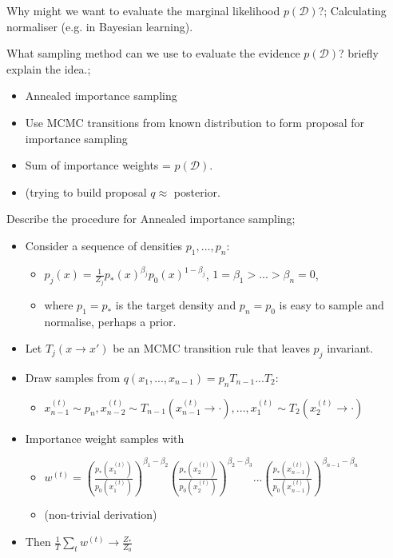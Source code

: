 \documentclass{article}
\begin{document}

Why might we want to evaluate the marginal likelihood $p(\mathcal{D})$?; Calculating normaliser (e.g. in Bayesian learning).

What sampling method can we use to evaluate the evidence $p(\mathcal{D})$? briefly explain the idea.; \begin{itemize} \item Annealed importance sampling \item Use MCMC transitions from known distribution to form proposal for importance sampling \item Sum of importance weights = $p(\mathcal{D})$. \item (trying to build proposal $q\approx$ posterior. \end{itemize}

Describe the procedure for Annealed importance sampling; \begin{itemize} \item Consider a sequence of densities $p_1, ..., p_n$: \begin{itemize} \item $p_j(x) = \frac{1}{Z_j}p_*(x)^{\beta_j}p_0(x)^{1-\beta_j}$, $1=\beta_1 > ... > \beta_n = 0$, \item where $p_1 = p_*$ is the target density and $p_n = p_0$ is easy to sample and normalise, perhaps a prior. \end{itemize} \item Let $T_j(x\rightarrow x')$ be an MCMC transition rule that leaves $p_j$ invariant. \item Draw samples from $q(x_1,...,x_{n-1}) = p_nT_{n-1}...T_2$: \begin{itemize} \item $x_{n-1}^{(t)}\sim p_n, x^{(t)}_{n-2} \sim T_{n-1}(x^{(t)}_{n-1}\rightarrow \cdot ), ..., x^{(t)}_1\sim T_2(x_2^{(t)}\rightarrow \cdot)$ \end{itemize} \item Importance weight samples with \begin{itemize} \item $w^{(t)} = (\frac{p_*(x_1^{(t)})}{p_0(x_1^{(t)})})^{\beta_1-\beta_2}(\frac{p_*(x_2^{(t)})}{p_0(x_2^{(t)})})^{\beta_2-\beta_3}...(\frac{p_*(x_{n-1}^{(t)})}{p_0(x_{n-1}^{(t)})})^{\beta_{n-1}-\beta_n}$ \item (non-trivial derivation) \end{itemize} \item Then $\frac{1}{T}\sum_t w^{(t)} \rightarrow \frac{Z_*}{Z_0}$ \end{itemize}
\end{document}
